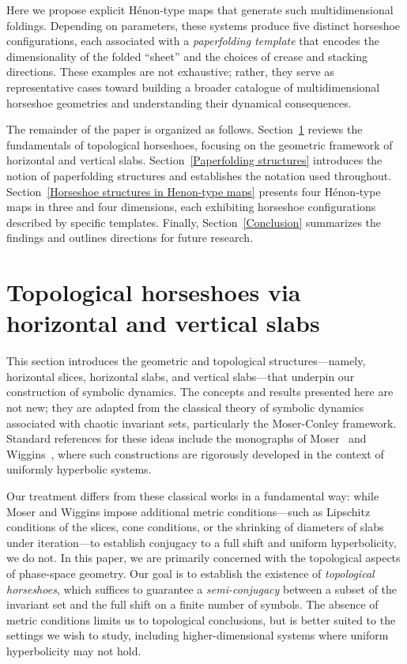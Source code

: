 \documentclass[12pt]{iopart}
\begin{document}
Here we propose explicit H\'{e}non-type maps that generate such multidimensional foldings. Depending on parameters, these systems produce five distinct horseshoe configurations, each associated with a \emph{paperfolding template} that encodes the dimensionality of the folded ``sheet'' and the choices of crease and stacking directions. These examples are not exhaustive; rather, they serve as representative cases toward building a broader catalogue of multidimensional horseshoe geometries and understanding their dynamical consequences.

The remainder of the paper is organized as follows. Section~\ref{Topological horseshoes via horizontal and vertical slabs} reviews the fundamentals of topological horseshoes, focusing on the geometric framework of horizontal and vertical slabs. Section~\ref{Paperfolding structures} introduces the notion of paperfolding structures and establishes the notation used throughout. Section~\ref{Horseshoe structures in Henon-type maps} presents four H\'{e}non-type maps in three and four dimensions, each exhibiting horseshoe configurations described by specific templates. Finally, Section~\ref{Conclusion} summarizes the findings and outlines directions for future research.



\section{Topological horseshoes via horizontal and vertical slabs}
\label{Topological horseshoes via horizontal and vertical slabs}

This section introduces the geometric and topological structures—namely, horizontal slices, horizontal slabs, and vertical slabs—that underpin our construction of symbolic dynamics. The concepts and results presented here are not new; they are adapted from the classical theory of symbolic dynamics associated with chaotic invariant sets, particularly the Moser-Conley framework. Standard references for these ideas include the monographs of Moser~\cite{Moser01} and Wiggins~\cite{Wiggins88}, where such constructions are rigorously developed in the context of uniformly hyperbolic systems.

Our treatment differs from these classical works in a fundamental way: while Moser and Wiggins impose additional metric conditions—such as Lipschitz conditions of the slices, cone conditions, or the shrinking of diameters of slabs under iteration—to establish conjugacy to a full shift and uniform hyperbolicity, we do not. In this paper, we are primarily concerned with the topological aspects of phase-space geometry. Our goal is to establish the existence of \emph{topological horseshoes}, which suffices to guarantee a \emph{semi-conjugacy} between a subset of the invariant set and the full shift on a finite number of symbols. The absence of metric conditions limits us to topological conclusions, but is better suited to the settings we wish to study, including higher-dimensional systems where uniform hyperbolicity may not hold.
\end{document}

